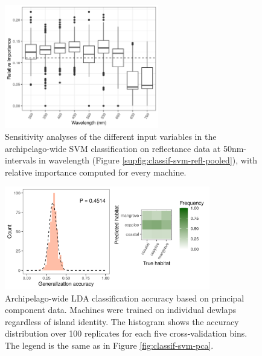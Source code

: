 \begin{figure}[H]
	\centering
	\includegraphics[width=0.6\textwidth]{suppfigures/importance_svm_refl_pooled.png}
	\caption{Sensitivity analyses of the different input variables in the archipelago-wide SVM classification on reflectance data at 50nm-intervals in wavelength (Figure \ref{supfig:classif-svm-refl-pooled}), with relative importance computed for every machine.}
	\label{supfig:importance-svm-refl-pooled}
\end{figure}

\begin{figure}[H]
	\centering
	\includegraphics[width=0.8\textwidth]{suppfigures/classif_lda_pca_pooled.png}
	\caption{Archipelago-wide LDA classification accuracy based on principal component data. Machines were trained on individual dewlaps regardless of island identity. The histogram shows the accuracy distribution over 100 replicates for each five cross-validation bins. The legend is the same as in Figure \ref{fig:classif-svm-pca}.}
	\label{supfig:classif-lda-pca-pooled}
\end{figure}

